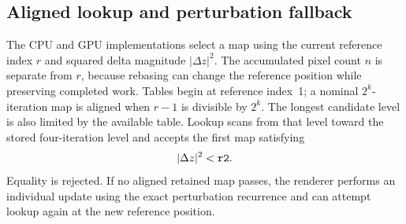\subsection{Aligned lookup and perturbation fallback}
\label{sec:bla-v1-lookup}

The CPU  and GPU  implementations select a
map using the current reference index $r$ and squared delta magnitude
$|\Delta z|^2$. The accumulated pixel count $n$ is separate from $r$,
because rebasing can change the reference position while preserving
completed work. Tables begin at reference index~1; a nominal
$2^k$-iteration map is aligned when $r-1$ is divisible by $2^k$.
The longest candidate level is also limited by the available table.
Lookup scans from that level toward the stored four-iteration level
and accepts the first map satisfying
\begin{equation}
|\Delta z|^2<\texttt{r2}.
\label{eq:bla-v1-lookup}
\end{equation}
Equality is rejected. If no aligned retained map passes, the renderer
performs an individual update using the exact perturbation recurrence
and can attempt lookup again at the new reference position.

